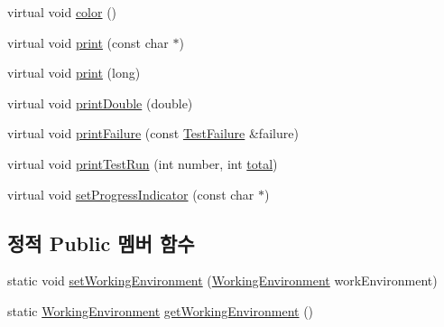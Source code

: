 \begin{DoxyCompactItemize}
\item 
virtual void \hyperlink{class_test_output_ae8d23f2d3de1d9d47d8139d54fb89640}{color} ()
\item 
virtual void \hyperlink{class_test_output_a321b5c489a90374cb61c34fe5d2253ef}{print} (const char $\ast$)
\item 
virtual void \hyperlink{class_test_output_afdf7e5004a8aead20ea3b1ddec76fa73}{print} (long)
\item 
virtual void \hyperlink{class_test_output_a0ed13c187762336a2bf0fd89687b014a}{print\+Double} (double)
\item 
virtual void \hyperlink{class_test_output_abda4b89457f485fa538443ee10aecfe8}{print\+Failure} (const \hyperlink{class_test_failure}{Test\+Failure} \&failure)
\item 
virtual void \hyperlink{class_test_output_a0cffc4628d21b0cd25649f9084927ca9}{print\+Test\+Run} (int number, int \hyperlink{test__intervals_8c_ac7af894858cf396a219d632f40afdc8d}{total})
\item 
virtual void \hyperlink{class_test_output_a97c09fc275d40b7ec559aaa91843cdcd}{set\+Progress\+Indicator} (const char $\ast$)
\end{DoxyCompactItemize}
\subsection*{정적 Public 멤버 함수}
\begin{DoxyCompactItemize}
\item 
static void \hyperlink{class_test_output_a25907ddd60d8454ca78f81edef6c77c3}{set\+Working\+Environment} (\hyperlink{class_test_output_a0541851f863713454486a9fb3080f766}{Working\+Environment} work\+Environment)
\item 
static \hyperlink{class_test_output_a0541851f863713454486a9fb3080f766}{Working\+Environment} \hyperlink{class_test_output_a90d5028d0f7f6f41ca2dced042a8709d}{get\+Working\+Environment} ()
\end{DoxyCompactItemize}
